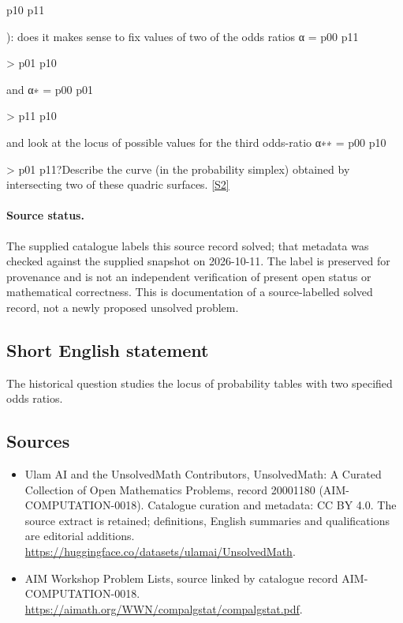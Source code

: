 \documentclass[11pt]{article}
\newcommand{\sref}[2]{\hyperlink{source:#1:#2}{[S#2]}}
\begin{document}
p10 p11

): does it makes sense to fix values of two of the odds ratios α = p00 p11

> p01 p10

and α∗ = p00 p01

> p11 p10

and look at the locus of possible values for the third odds-ratio α∗∗ = p00 p10

> p01 p11?Describe the curve (in the probability simplex) obtained by intersecting two of these quadric surfaces. \sref{20001180}{2}
\paragraph{Source status.}
The supplied catalogue labels this source record solved; that metadata was checked against the supplied snapshot on 2026-10-11. The label is preserved for provenance and is not an independent verification of present open status or mathematical correctness. This is documentation of a source-labelled solved record, not a newly proposed unsolved problem.
\subsection{Short English statement}
The historical question studies the locus of probability tables with two specified odds ratios.
\subsection{Sources}
\begin{itemize}
\item[\hypertarget{source:20001180:1}{S1}] Ulam AI and the UnsolvedMath Contributors, UnsolvedMath: A Curated Collection of Open Mathematics Problems, record 20001180 (AIM-COMPUTATION-0018). Catalogue curation and metadata: CC BY 4.0. The source extract is retained; definitions, English summaries and qualifications are editorial additions.
\url{https://huggingface.co/datasets/ulamai/UnsolvedMath}.
\item[\hypertarget{source:20001180:2}{S2}] AIM Workshop Problem Lists, source linked by catalogue record AIM-COMPUTATION-0018.
\url{https://aimath.org/WWN/compalgstat/compalgstat.pdf}.
\end{itemize}
\end{document}
